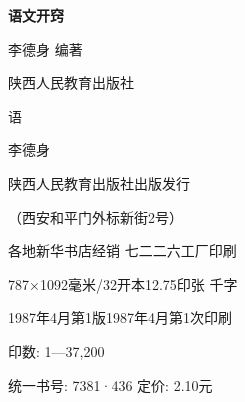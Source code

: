 \begin{titlepage}
    \begin{center}
        \vspace*{3cm}

        {\Huge \textbf{语\hfill 文\hfill 开\hfill 窍} }
        \vspace*{3cm}

        {\Large 李德身 \quad 编著}
        \vspace*{\fill}
        
        {\Large 陕西人民教育出版社}
        \newpage

        \vspace*{\fill}
        语

        李德身

        陕西人民教育出版社出版发行

        （西安和平门外标新街2号）

        各地新华书店经销 \quad 七二二六工厂印刷

        787×1092毫米/32开本\quad12.75印张 千字

        1987年4月第1版\quad1987年4月第1次印刷

        印数: 1—37,200

        统一书号: 7381·436 \quad 定价: 2.10元
    \end{center}
\end{titlepage}